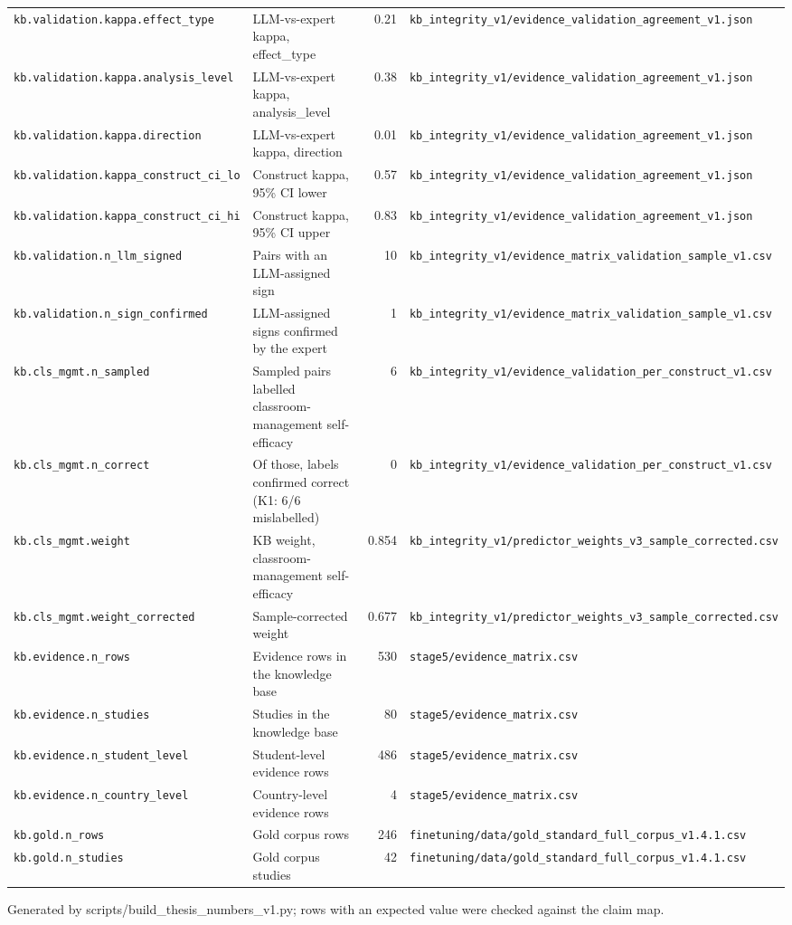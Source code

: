 {\begin{longtable}{p{4.6cm}p{5.6cm}rp{3.6cm}}
\texttt{kb.validation.kappa.effect\_type} & LLM-vs-expert kappa, effect\_type & 0.21 & \texttt{kb\_integrity\_v1/evidence\_validation\_agreement\_v1.json} \\
\texttt{kb.validation.kappa.analysis\_level} & LLM-vs-expert kappa, analysis\_level & 0.38 & \texttt{kb\_integrity\_v1/evidence\_validation\_agreement\_v1.json} \\
\texttt{kb.validation.kappa.direction} & LLM-vs-expert kappa, direction & 0.01 & \texttt{kb\_integrity\_v1/evidence\_validation\_agreement\_v1.json} \\
\texttt{kb.validation.kappa\_construct\_ci\_lo} & Construct kappa, 95\% CI lower & 0.57 & \texttt{kb\_integrity\_v1/evidence\_validation\_agreement\_v1.json} \\
\texttt{kb.validation.kappa\_construct\_ci\_hi} & Construct kappa, 95\% CI upper & 0.83 & \texttt{kb\_integrity\_v1/evidence\_validation\_agreement\_v1.json} \\
\texttt{kb.validation.n\_llm\_signed} & Pairs with an LLM-assigned sign & 10 & \texttt{kb\_integrity\_v1/evidence\_matrix\_validation\_sample\_v1.csv} \\
\texttt{kb.validation.n\_sign\_confirmed} & LLM-assigned signs confirmed by the expert & 1 & \texttt{kb\_integrity\_v1/evidence\_matrix\_validation\_sample\_v1.csv} \\
\texttt{kb.cls\_mgmt.n\_sampled} & Sampled pairs labelled classroom-management self-efficacy & 6 & \texttt{kb\_integrity\_v1/evidence\_validation\_per\_construct\_v1.csv} \\
\texttt{kb.cls\_mgmt.n\_correct} & Of those, labels confirmed correct (K1: 6/6 mislabelled) & 0 & \texttt{kb\_integrity\_v1/evidence\_validation\_per\_construct\_v1.csv} \\
\texttt{kb.cls\_mgmt.weight} & KB weight, classroom-management self-efficacy & 0.854 & \texttt{kb\_integrity\_v1/predictor\_weights\_v3\_sample\_corrected.csv} \\
\texttt{kb.cls\_mgmt.weight\_corrected} & Sample-corrected weight & 0.677 & \texttt{kb\_integrity\_v1/predictor\_weights\_v3\_sample\_corrected.csv} \\
\texttt{kb.evidence.n\_rows} & Evidence rows in the knowledge base & 530 & \texttt{stage5/evidence\_matrix.csv} \\
\texttt{kb.evidence.n\_studies} & Studies in the knowledge base & 80 & \texttt{stage5/evidence\_matrix.csv} \\
\texttt{kb.evidence.n\_student\_level} & Student-level evidence rows & 486 & \texttt{stage5/evidence\_matrix.csv} \\
\texttt{kb.evidence.n\_country\_level} & Country-level evidence rows & 4 & \texttt{stage5/evidence\_matrix.csv} \\
\texttt{kb.gold.n\_rows} & Gold corpus rows & 246 & \texttt{finetuning/data/gold\_standard\_full\_corpus\_v1.4.1.csv} \\
\texttt{kb.gold.n\_studies} & Gold corpus studies & 42 & \texttt{finetuning/data/gold\_standard\_full\_corpus\_v1.4.1.csv} \\
\end{longtable}
{\scriptsize Generated by scripts/build\_thesis\_numbers\_v1.py; rows with an expected value were checked against the claim map.}
}
